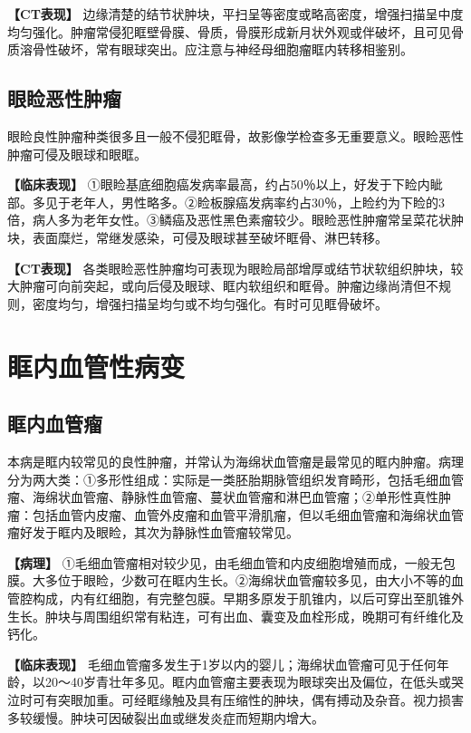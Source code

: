 \textbf{【CT表现】}
边缘清楚的结节状肿块，平扫呈等密度或略高密度，增强扫描呈中度均匀强化。肿瘤常侵犯眶壁骨膜、骨质，骨膜形成新月状外观或伴破坏，且可见骨质溶骨性破坏，常有眼球突出。应注意与神经母细胞瘤眶内转移相鉴别。

\subsection{眼睑恶性肿瘤}

眼睑良性肿瘤种类很多且一般不侵犯眶骨，故影像学检查多无重要意义。眼睑恶性肿瘤可侵及眼球和眼眶。

\textbf{【临床表现】}
①眼睑基底细胞癌发病率最高，约占50％以上，好发于下睑内眦部。多见于老年人，男性略多。②睑板腺癌发病率约占30％，上睑约为下睑的3倍，病人多为老年女性。③鳞癌及恶性黑色素瘤较少。眼睑恶性肿瘤常呈菜花状肿块，表面糜烂，常继发感染，可侵及眼球甚至破坏眶骨、淋巴转移。

\textbf{【CT表现】}
各类眼睑恶性肿瘤均可表现为眼睑局部增厚或结节状软组织肿块，较大肿瘤可向前突起，或向后侵及眼球、眶内软组织和眶骨。肿瘤边缘尚清但不规则，密度均匀，增强扫描呈均匀或不均匀强化。有时可见眶骨破坏。

\section{眶内血管性病变}

\subsection{眶内血管瘤}

本病是眶内较常见的良性肿瘤，并常认为海绵状血管瘤是最常见的眶内肿瘤。病理分为两大类：①多形性组成：实际是一类胚胎期脉管组织发育畸形，包括毛细血管瘤、海绵状血管瘤、静脉性血管瘤、蔓状血管瘤和淋巴血管瘤；②单形性真性肿瘤：包括血管内皮瘤、血管外皮瘤和血管平滑肌瘤，但以毛细血管瘤和海绵状血管瘤好发于眶内及眼睑，其次为静脉性血管瘤较常见。

\textbf{【病理】}
①毛细血管瘤相对较少见，由毛细血管和内皮细胞增殖而成，一般无包膜。大多位于眼睑，少数可在眶内生长。②海绵状血管瘤较多见，由大小不等的血管腔构成，内有红细胞，有完整包膜。早期多原发于肌锥内，以后可穿出至肌锥外生长。肿块与周围组织常有粘连，可有出血、囊变及血栓形成，晚期可有纤维化及钙化。

\textbf{【临床表现】}
毛细血管瘤多发生于1岁以内的婴儿；海绵状血管瘤可见于任何年龄，以20～40岁青壮年多见。眶内血管瘤主要表现为眼球突出及偏位，在低头或哭泣时可有突眼加重。可经眶缘触及具有压缩性的肿块，偶有搏动及杂音。视力损害多较缓慢。肿块可因破裂出血或继发炎症而短期内增大。

